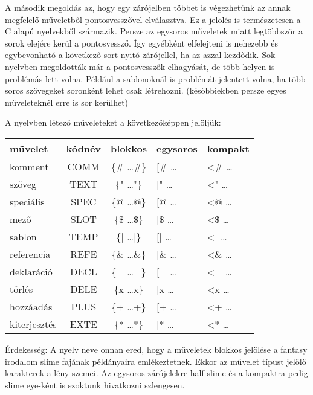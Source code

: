 {A második megoldás az, hogy egy zárójelben többet is végezhetünk az annak megfelelő műveletből pontosvesszővel elválasztva. 
Ez a jelölés is természetesen a C alapú nyelvekből származik. 
Persze az egysoros műveletek miatt legtöbbször a sorok elejére kerül a pontosvessző. 
Így egyébként elfelejteni is nehezebb és egybevonható a következő sort nyitó zárójellel, ha az azzal kezdődik. 
Sok nyelvben megoldották már a pontosvesszők elhagyását, de több helyen is problémás lett volna.
Például a sablonoknál is problémát jelentett volna, ha több soros szövegeket soronként lehet csak létrehozni. 
(későbbiekben persze egyes műveleteknél erre is sor kerülhet)

A nyelvben létező műveleteket a következőképpen jelöljük:

\begin{center}
  \begin{tabular}{ | l | c | c | l | l | }
    \hline
    művelet		& kódnév 	& blokkos 		& egysoros 	& kompakt	\\ \hline
    komment		& COMM 		& \{\# …\#\} 	& [\# … 	& <\# … 	\\ \hline
    szöveg 		& TEXT 		& \{" …"\} 		& [" … 		& <" … 		\\ \hline
    speciális	& SPEC 		& \{@ …@\} 		& [@ … 		& <@ … 		\\ \hline
    mező 		& SLOT 		& \{\$ …\$\} 	& [\$ … 	& <\$ … 	\\ \hline
    sablon 		& TEMP 		& \{| …|\} 		& [| … 		& <| … 		\\ \hline
    referencia	& REFE 		& \{\& …\&\} 	& [\& … 	& <\& … 	\\ \hline 
    deklaráció 	& DECL 		& \{= …=\} 		& [= … 		& <= … 		\\ \hline
    törlés 		& DELE 		& \{x …x\} 		& [x … 		& <x … 		\\ \hline
    hozzáadás	& PLUS 		& \{+ …+\} 		& [+ … 		& <+ … 		\\ \hline
    kiterjesztés& EXTE 		& \{* …*\} 		& [* … 		& <* … 		\\
    \hline
  \end{tabular}
\end{center}
	 	 	
Érdekesség:
A nyelv neve onnan ered, hogy a műveletek blokkos jelölése a fantasy irodalom slime fajának példányaira emlékeztetnek.
Ekkor az művelet típust jelölő karakterek a lény szemei. 
Az egysoros zárójelekre half slime és a kompaktra pedig slime eye-ként is szoktunk hivatkozni szlengesen.

}
